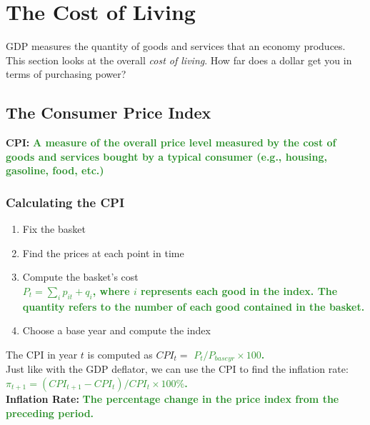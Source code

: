 \documentclass[11pt]{article}\usepackage[]{graphicx}\usepackage[]{color}
\theoremstyle{definition}
\newcommand{\ddp}[1]{{\textbf{\textcolor{ForestGreen}{#1}}}}
\newcommand{\defn}[1]{\textbf{#1}}
\begin{document}
\newpage

\section{The Cost of Living}

GDP measures the quantity of goods and services that an economy produces. This section looks at the overall \textit{cost of living}. How far does a dollar get you in terms of purchasing power?

\subsection{The Consumer Price Index}

\defn{CPI:} \ddp{A measure of the overall price level measured by the cost of goods and services bought by a typical consumer (e.g., housing, gasoline, food, etc.)}

\subsubsection*{Calculating the CPI}

\begin{enumerate}
	\setlength{\itemsep}{.75em}
	\item Fix the basket 
	\item Find the prices at each point in time
	\item Compute the basket's cost \ddp{\\$P_t = \sum_i p_{it} + q_{i}$, where $i$ represents each good in the index. The quantity refers to the number of each good contained in the basket.}
	\item Choose a base year and compute the index
\end{enumerate}

The CPI in year $t$ is computed as $CPI_t = $ \ddp{$P_t/P_{base yr} \times 100$.}
\\

Just like with the GDP deflator, we can use the CPI to find the inflation rate:
\ddp{\\$\pi_{t+1} = (CPI_{t+1} - CPI_t)/CPI_t \times 100\%$.}
\\

\defn{Inflation Rate:} \ddp{The percentage change in the price index from the preceding period.}
\end{document}
